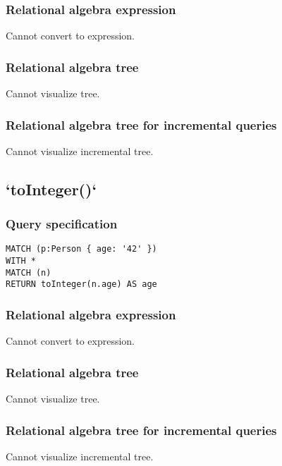 \subsubsection*{Relational algebra expression}

Cannot convert to expression.

\subsubsection*{Relational algebra tree}

Cannot visualize tree.

\subsubsection*{Relational algebra tree for incremental queries}

Cannot visualize incremental tree.

\subsection{`toInteger()`}

\subsubsection*{Query specification}

\begin{lstlisting}
MATCH (p:Person { age: '42' })
WITH *
MATCH (n)
RETURN toInteger(n.age) AS age
\end{lstlisting}

\subsubsection*{Relational algebra expression}

Cannot convert to expression.

\subsubsection*{Relational algebra tree}

Cannot visualize tree.

\subsubsection*{Relational algebra tree for incremental queries}

Cannot visualize incremental tree.


